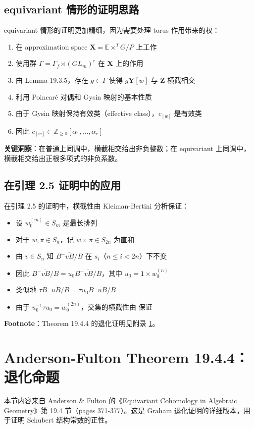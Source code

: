 \subsection{equivariant 情形的证明思路}equivariant 情形的证明更加精细，因为需要处理 torus 作用带来的权：
\begin{enumerate}
\item 在 approximation space $\mathbf{X} = \mathbb{E} \times^T G/P$ 上工作\item 使用群 $\Gamma = \Gamma_f \rtimes (GL_m)^r$ 在 $\mathbf{X}$ 上的作用\item 由 Lemma 19.3.5，存在 $g \in \Gamma$ 使得 $g\mathbf{Y}[w]$ 与 $\mathbf{Z}$ 横截相交\item 利用 Poincaré 对偶和 Gysin 映射的基本性质\item 由于 Gysin 映射保持有效类（effective class），$c_{[w]}$ 是有效类\item 因此 $c_{[w]} \in \mathbb{Z}_{\geq 0}[\alpha_1, \ldots, \alpha_r]$
\end{enumerate}

\textbf{关键洞察}：在普通上同调中，横截相交给出非负整数；在 equivariant 上同调中，横截相交给出正根多项式的非负系数。
\subsection{在引理 2.5 证明中的应用}在引理 2.5 的证明中，横截性由 Kleiman-Bertini 分析保证：
\begin{itemize}
\item 设 $w_0^{(m)} \in S_m$ 是最长排列\item 对于 $w, \pi \in S_n$，记 $w \times \pi \in S_{2n}$ 为直和\item 由 $v \in S_n$ 知 $\overline{B^-vB/B}$ 在 $s_i$（$n \leq i < 2n$）下不变\item 因此 $\overline{B^-vB/B} = u_0 \overline{B^-vB/B}$，其中 $u_0 = 1 \times w_0^{(n)}$\item 类似地 $\tau \overline{B^-uB/B} = \tau u_0 \overline{B^-uB/B}$\item 由于 $u_0^{-1}\tau u_0 = w_0^{(2n)}$，交集的横截性由 \cite[Lemma 19.3.5]{anderson2023} 保证
\end{itemize}

\textbf{Footnote}：Theorem 19.4.4 的退化证明见附录 \cref{sec:AndersonFulton19-4}。
\section{Anderson-Fulton Theorem 19.4.4：退化命题}\label{sec:AndersonFulton19-4}本节内容来自 Anderson \& Fulton 的《Equivariant Cohomology in Algebraic Geometry》\cite{anderson2023}第 19.4 节（pages 371-377）。这是 Graham 退化证明的详细版本，用于证明 Schubert 结构常数的正性。
